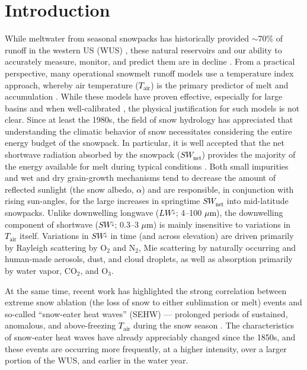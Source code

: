 \documentclass[draft]{agujournal2019}
\newcommand{\tair}{\textcolor{black}{$T_{\mathrm{air}}$}\xspace}
\newcommand{\lwdn}{\textcolor{black}{$LW^{\downarrow}$}\xspace}
\newcommand{\swnet}{\textcolor{black}{$SW_{\mathrm{net}}$}\xspace}
\newcommand{\swdn}{\textcolor{black}{$SW^{\downarrow}$}\xspace}
\newcommand{\albedo}{\textcolor{black}{$\alpha$}\xspace}
\newcommand{\um}{\textcolor{black}{$\mu$m}\xspace}
\begin{document}
\section{Introduction}
While meltwater from seasonal snowpacks has historically provided $\sim$70\% of runoff in the western US (WUS) \cite{Li2017-dj}, these natural reservoirs and our ability to accurately measure, monitor, and predict them are in decline \cite{Hale2023-kx, Cowherd2024-zm}.
From a practical perspective, many operational snowmelt runoff models use a temperature index approach, whereby air temperature (\tair) is the primary predictor of melt and accumulation \cite{Anderson1973-jx}.
While these models have proven effective, especially for large basins and when well-calibrated \cite{REIS-model}, the physical justification for such models is not clear.
Since at least the 1980s, the field of snow hydrology has appreciated that understanding the climatic behavior of snow necessitates considering the entire energy budget of the snowpack.
In particular, it is well accepted that the net shortwave radiation absorbed by the snowpack (\swnet) provides the majority of the energy available for melt during typical conditions \cite{Marks1992-qo, Cline1997-de}.
Both small impurities \cite{Deems2013-vv, Skiles2018-ih} and wet and dry grain-growth mechanisms \cite{Colbeck1982-gv} tend to decrease the amount of reflected sunlight (the snow albedo, \albedo) and are responsible, in conjunction with rising sun-angles, for the large increases in springtime \swnet into mid-latitude snowpacks.
Unlike downwelling longwave (\lwdn; 4--100 \um), the downwelling component of shortwave (\swdn; 0.3--3 \um) is mainly insensitive to variations in \tair itself.
Variations in \swdn in time (and across elevation) are driven primarily by Rayleigh scattering by O$_2$ and N$_2$, Mie scattering by naturally occurring and human-made aerosols, dust, and cloud droplets, as well as absorption primarily by water vapor, CO$_2$, and O$_3$.

At the same time, recent work has highlighted the strong correlation between extreme snow ablation (the loss of snow to either sublimation or melt) events and so-called ``snow-eater heat waves'' (SEHW) --- prolonged periods of sustained, anomalous, and above-freezing \tair during the snow season \cite{Rhoades2026-jm}.
The characteristics of snow-eater heat waves have already appreciably changed since the 1850s, and these events are occurring more frequently, at a higher intensity, over a larger portion of the WUS, and earlier in the water year.
\end{document}
